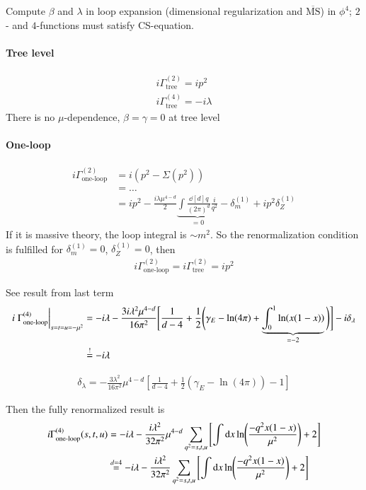Compute $\beta$ and $\lambda$ in loop expansion (dimensional regularization and $\overline{\text{MS}}$) in $\phi^4$; $2$- and $4$-functions must satisfy CS-equation.
\paragraph{Tree level}
\begin{align*}
   i \Gamma_\text{tree}^{(2)} = i p^2 \\
   i \Gamma_\text{tree}^{(4)} = -i \lambda
\end{align*}
There is no $\mu$-dependence, $\beta= \gamma=0$ at tree level

\paragraph{One-loop}
\begin{align*}
   i \Gamma_\text{one-loop}^{(2)} &= i (p^2 - \Sigma(p^2))  \\
                                  &= \dots \\
                                  &= ip^2 - \frac{i\lambda \mu^{4-d}}{2} \underbrace{\int \frac{\dd[d]{q}}{(2\pi)^d} \frac{i}{q^2}}_{=0} - \delta_m^{(1)} + ip^2 \delta_Z^{(1)}
\end{align*}
If it is massive theory, the loop integral is $\sim m^2$. So the renormalization condition is fulfilled for $\delta_m^{(1)} = 0$, $\delta_Z^{(1)} = 0$, then
\begin{align}
   i\Gamma_\text{one-loop}^{(2)} = i \Gamma_\text{tree}^{(2)} = i p^2
\end{align}

See result from last term
\begin{align*}
   i \eval{\Gamma^{(4)}_\text{one-loop}}_{s = t=u=-\mu^2} &= -i\lambda - \frac{3i\lambda^2 \mu^{4-d} }{16\pi^2} \Bigg[ \frac{1}{d-4} + \frac{1}{2} \Bigg( \gamma_E - \ln(4\pi) + \underbrace{\int_0^1 \ln(x(1-x))}_{=-2} \Bigg) \Bigg] - i \delta_\lambda \\
   &\stackrel{!}{=} -i \lambda
\end{align*}

\begin{align}
   \delta_\lambda = - \frac{3\lambda^2}{16\pi^2} \mu^{4-d} \left[ \frac{1}{d-4} + \frac{1}{2} \left( \gamma_E - \ln(4\pi) \right) - 1\right]
\end{align}

Then the fully renormalized result is
\begin{align}
   i\Gamma_\text{one-loop}^{(4)}(s,t,u) &= -i\lambda - \frac{i\lambda^2}{32\pi^2} \mu^{4-d} \sum_{q^2 = s, t, u} \left[ \int \dd{x} \ln(\frac{-q^2 x(1-x)}{\mu^2}) + 2 \right] \notag \\
                                        &\stackrel{d=4}{=} -i\lambda - \frac{i\lambda^2}{32\pi^2} \sum_{q^2 = s, t, u} \left[ \int \dd{x} \ln(\frac{-q^2 x(1-x)}{\mu^2}) + 2 \right]
\end{align}

